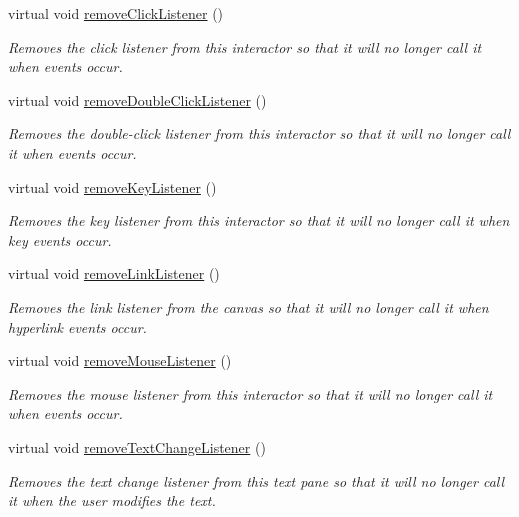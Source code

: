 \begin{DoxyCompactItemize}
virtual void \mbox{\hyperlink{classGInteractor_ad39d0325cde6b97ebda4b9d7787c633b}{remove\+Click\+Listener}} ()
\begin{DoxyCompactList}\small\item\em Removes the click listener from this interactor so that it will no longer call it when events occur. \end{DoxyCompactList}\item 
virtual void \mbox{\hyperlink{classGInteractor_aa4250907e4cdd77349c04f0cf5cdd3d3}{remove\+Double\+Click\+Listener}} ()
\begin{DoxyCompactList}\small\item\em Removes the double-\/click listener from this interactor so that it will no longer call it when events occur. \end{DoxyCompactList}\item 
virtual void \mbox{\hyperlink{classGInteractor_a43095f41cab3be732b49f29970484b05}{remove\+Key\+Listener}} ()
\begin{DoxyCompactList}\small\item\em Removes the key listener from this interactor so that it will no longer call it when key events occur. \end{DoxyCompactList}\item 
virtual void \mbox{\hyperlink{classGBrowserPane_a263a2282597ca9f0f73301fb202ae390}{remove\+Link\+Listener}} ()
\begin{DoxyCompactList}\small\item\em Removes the link listener from the canvas so that it will no longer call it when hyperlink events occur. \end{DoxyCompactList}\item 
virtual void \mbox{\hyperlink{classGInteractor_aff47f71ce47e688a07c9d38dc92fcc11}{remove\+Mouse\+Listener}} ()
\begin{DoxyCompactList}\small\item\em Removes the mouse listener from this interactor so that it will no longer call it when events occur. \end{DoxyCompactList}\item 
virtual void \mbox{\hyperlink{classGBrowserPane_a69c940b99d01eb7c353763ce4b0942a4}{remove\+Text\+Change\+Listener}} ()
\begin{DoxyCompactList}\small\item\em Removes the text change listener from this text pane so that it will no longer call it when the user modifies the text. \end{DoxyCompactList}\item 

\end{DoxyCompactItemize}
